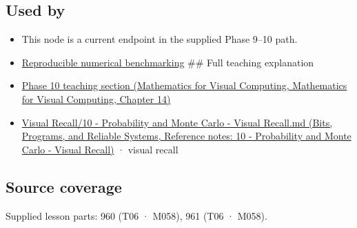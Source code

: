 \subsection{Used by}\label{appendix-c83016554b1e-used-by}

\begin{itemize}
\item
  This node is a current endpoint in the supplied Phase 9--10 path.
\item
  \hyperref[appendix-b9db93e28371]{Reproducible numerical benchmarking} \#\# Full teaching explanation
\item
  \href{../02-Mathematics-for-Visual-Computing/main.pdf\#nameddest=02-foundations-ii-ch030-inference-and-error-metrics-need-explicit-assumptions}{Phase 10 teaching section (Mathematics for Visual Computing, Mathematics for Visual Computing, Chapter 14)}
\item
  \href{../01-Bits-Programs-and-Reliable-Systems/main.pdf\#nameddest=appendix-cb5af353ef77}{Visual Recall/10 - Probability and Monte Carlo - Visual Recall.md (Bits, Programs, and Reliable Systems, Reference notes: 10 - Probability and Monte Carlo - Visual Recall)} · visual recall
\end{itemize}

\subsection{Source coverage}\label{appendix-c83016554b1e-source-coverage}

Supplied lesson parts: 960 (T06 · M058), 961 (T06 · M058).
